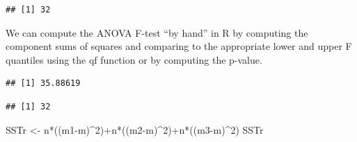 \documentclass[
]{book}
\newenvironment{Shaded}{\begin{snugshade}}{\end{snugshade}}
\newcommand{\CommentTok}[1]{\textcolor[rgb]{0.56,0.35,0.01}{\textit{#1}}}
\newcommand{\DecValTok}[1]{\textcolor[rgb]{0.00,0.00,0.81}{#1}}
\newcommand{\FunctionTok}[1]{\textcolor[rgb]{0.00,0.00,0.00}{#1}}
\newcommand{\NormalTok}[1]{#1}
\newcommand{\OtherTok}[1]{\textcolor[rgb]{0.56,0.35,0.01}{#1}}
\newcommand{\SpecialCharTok}[1]{\textcolor[rgb]{0.00,0.00,0.00}{#1}}
\begin{document}
\begin{verbatim}
## [1] 32
\end{verbatim}

We can compute the ANOVA F-test ``by hand'' in R by computing the component sums of squares and comparing to the appropriate lower and upper F quantiles using the qf function or by computing the p-value.

\begin{Shaded}
\end{Shaded}

\begin{verbatim}
## [1] 35.88619
\end{verbatim}

\begin{Shaded}
\end{Shaded}

\begin{verbatim}
## [1] 32
\end{verbatim}

\begin{Shaded}
\begin{Highlighting}[]
\NormalTok{SSTr }\OtherTok{\textless{}{-}}\NormalTok{ n}\SpecialCharTok{*}\NormalTok{((m1}\SpecialCharTok{{-}}\NormalTok{m)}\SpecialCharTok{\^{}}\DecValTok{2}\NormalTok{)}\SpecialCharTok{+}\NormalTok{n}\SpecialCharTok{*}\NormalTok{((m2}\SpecialCharTok{{-}}\NormalTok{m)}\SpecialCharTok{\^{}}\DecValTok{2}\NormalTok{)}\SpecialCharTok{+}\NormalTok{n}\SpecialCharTok{*}\NormalTok{((m3}\SpecialCharTok{{-}}\NormalTok{m)}\SpecialCharTok{\^{}}\DecValTok{2}\NormalTok{)}
\NormalTok{SSTr}
\end{Highlighting}
\end{Shaded}
\end{document}
